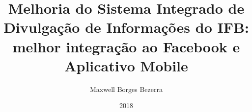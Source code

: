 \documentclass[pt,oneside,onehalfspacing,bsc]{ifbthesis}
\title{Melhoria do Sistema Integrado de Divulgação de Informações do IFB: melhor integração ao Facebook e Aplicativo Mobile}
\date{2018}
\author{Maxwell Borges Bezerra}
\begin{document}
\frontmatter

\frontpage

\presentationpage

\begin{fichacatalografica}
	\FakeFichaCatalografica %
\end{fichacatalografica}

\banca

\begin{dedicatory}
    
\end{dedicatory}

\acknowledgements


\gdef\resumoname{Resumo} 
{\parindent0pt
	
}

\abstract
{\parindent0pt
	
}

\listoffigures

\lstlistoflistings

\listoftables

\listofacronyms


\tableofcontents

\mainmatter










\begin{references}
  
\end{references}


\theappendix

\end{document}
